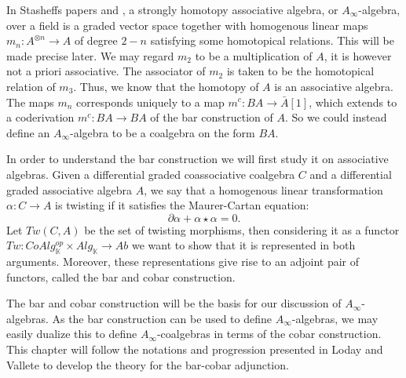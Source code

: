 \documentclass[../thesis.tex]{subfiles}
\begin{document}
        In Stasheffs papers \cite{Stasheff63I} and \cite{Stasheff63II}, a strongly homotopy associative algebra, or $A_\infty$-algebra, over a field is a graded vector space together with homogenous linear maps $m_n:A^{\otimes n}\rightarrow A$ of degree $2-n$ satisfying some homotopical relations. This will be made precise later. We may regard $m_2$ to be a multiplication of $A$, it is however not a priori associative. The associator of $m_2$ is taken to be the homotopical relation of $m_3$. Thus, we know that the homotopy of $A$ is an associative algebra. The maps $m_n$ corresponds uniquely to a map $m^c:BA\rightarrow \bar{A}[1]$, which extends to a coderivation $m^c : BA\rightarrow BA$ of the bar construction of $A$. So we could instead define an $A_\infty$-algebra to be a coalgebra on the form $BA$.


        In order to understand the bar construction we will first study it on associative algebras. Given a differential graded coassociative coalgebra $C$ and a differential graded associative algebra $A$, we say that a homogenous linear transformation $\alpha: C\rightarrow A$ is twisting if it satisfies the Maurer-Cartan equation:
            \begin{equation*}
                \partial\alpha + \alpha\star\alpha = 0.
            \end{equation*}
        Let $Tw(C,A)$ be the set of twisting morphisms, then considering it as a functor $Tw : CoAlg_{\mathbb{K}}^{op}\times Alg_{\mathbb{K}} \rightarrow Ab$ we want to show that it is represented in both arguments. Moreover, these representations give rise to an adjoint pair of functors, called the bar and cobar construction.

        \begin{center}
        \end{center}

        The bar and cobar construction will be the basis for our discussion of $A_\infty$-algebras. As the bar construction can be used to define $A_\infty$-algebras, we may easily dualize this to define $A_\infty$-coalgebras in terms of the cobar construction. This chapter will follow the notations and progression presented in Loday and Vallete \cite{Loday12} to develop the theory for the bar-cobar adjunction.
\end{document}
